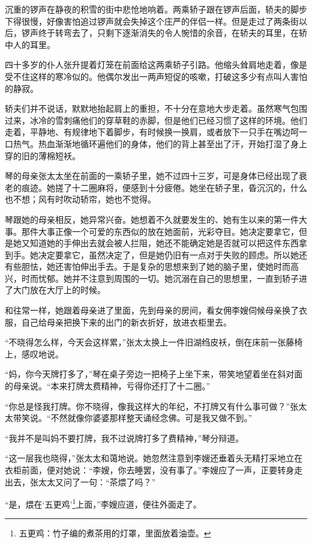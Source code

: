 \par 沉重的锣声在静夜的积雪的街中悲怆地响着。两乘轿子跟在锣声后面，轿夫的脚步下得很慢，好像害怕追过锣声就会失掉这个庄严的伴侣一样。但是走过了两条街以后，锣声终于转弯去了，只剩下逐渐消失的令人惋惜的余音，在轿夫的耳里，在轿中人的耳里。
\par 四十多岁的仆人张升提着灯笼在前面给这两乘轿子引路。他缩头耸肩地走着，像是受不住这样的寒冷似的。他偶尔发出一两声短促的咳嗽，打破这多少有点叫人害怕的静寂。
\par 轿夫们并不说话，默默地抬起肩上的重担，不十分在意地大步走着。虽然寒气包围过来，冰冷的雪刺痛他们的穿草鞋的赤脚，但是他们已经习惯了这样的环境。他们走着，平静地、有规律地下着脚步，有时候换一换肩，或者放下一只手在嘴边呵一口热气。热血渐渐地循环遍他们的身体，他们的背上甚至出了汗，开始打湿了身上穿的旧的薄棉短袄。
\par 琴的母亲张太太坐在前面的一乘轿子里，她不过四十三岁，可是身体已经出现了衰老的痕迹。她搓了十二圈麻将，便感到十分疲倦。她坐在轿子里，昏沉沉的，什么也不想；风有时吹动轿帘，她也不觉得。
\par 琴跟她的母亲相反，她异常兴奋。她想着不久就要发生的、她有生以来的第一件大事。那件大事正像一个可爱的东西似的放在她面前，光彩夺目。她决定要拿它，但是她又知道她的手伸出去就会被人拦阻，她还不能确定她是否就可以把这件东西拿到手。她决定要拿它，虽然决定了，但是她仍旧有一点对于失败的顾虑。所以她还有些胆怯，她还害怕伸出手去。于是复杂的思想来到了她的脑子里，使她时而高兴，时而忧郁。她并不注意到周围的一切。她沉溺在自己的思想里，一直到轿子进了大门放在大厅上的时候。
\par 和往常一样，她跟着母亲进了里面，先到母亲的房间，看女佣李嫂伺候母亲换了衣服，自己给母亲把换下来的出门的新衣折好，放进衣柜里去。
\par “不晓得怎么样，今天会这样累，”张太太换上一件旧湖绉皮袄，倒在床前一张藤椅上，感叹地说。
\par “妈，你今天牌打多了，”琴在桌子旁边一把椅子上坐下来，带笑地望着坐在斜对面的母亲说。“本来打牌太费精神，亏得你还打了十二圈。”
\par “你总是怪我打牌。你不晓得，像我这样大的年纪，不打牌又有什么事可做？”张太太带笑说。“不然就像你婆婆那样整天诵经念佛。可是我又做不到。”
\par “我并不是叫妈不要打牌，我不过说牌打多了费精神，”琴分辩道。
\par “这一层我也晓得，”张太太和蔼地说。她忽然注意到李嫂还垂着头无精打采地立在衣柜前面，便对她说：“李嫂，你去睡罢，没有事了。”李嫂应了一声，正要转身走出去，张太太又问了一句：“茶煨了吗？”
\par “是，煨在‘五更鸡’\footnote{五更鸡：竹子编的煮茶用的灯罩，里面放着油壶。}上面，”李嫂应道，便往外面走了。
